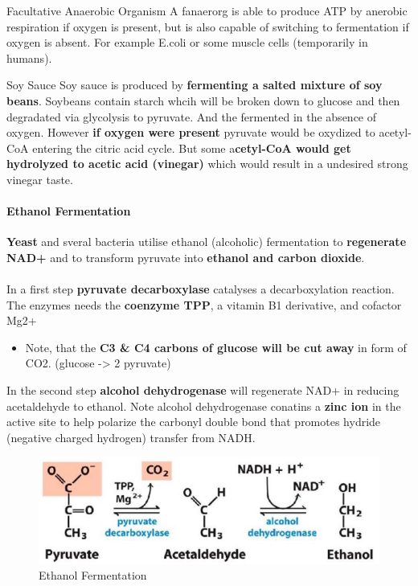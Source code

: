 \documentclass[../main.tex]{subfiles}
\begin{document}
\begin{DefWithTitle}{Facultative Anaerobic Organism}
	A \gls{fanaerorg} is able to produce ATP by anerobic respiration if oxygen is present, but is also capable of switching to fermentation if oxygen is absent. For example E.coli or some muscle cells (temporarily in humans). 
\end{DefWithTitle}

\begin{RemarkWithTitel}{Soy Sauce}
	Soy sauce is produced by \textbf{fermenting a salted mixture of soy beans}. Soybeans contain starch whcih will be broken down to glucose and then degradated via glycolysis to pyruvate. And the fermented in the absence of oxygen. However \textbf{if oxygen were present} pyruvate would be oxydized to acetyl-CoA entering the citric acid cycle. But some a\textbf{cetyl-CoA would get hydrolyzed to acetic acid (vinegar)} which would result in a undesired strong vinegar taste.
\end{RemarkWithTitel}

\paragraph{Ethanol Fermentation}
\textbf{Yeast} and sveral bacteria utilise ethanol (alcoholic) fermentation to \textbf{regenerate NAD+} and to transform pyruvate into \textbf{ethanol and carbon dioxide}.\\
\\
In a first step \textbf{pyruvate decarboxylase} catalyses a decarboxylation reaction. The enzymes needs the\textbf{ coenzyme TPP}, a vitamin B1 derivative, and cofactor Mg2+ 
\begin{itemize}
	\item Note, that the \textbf{C3 \& C4 carbons of glucose will be cut away} in form of CO2. (glucose -> 2 pyruvate)
\end{itemize}
In the second step \textbf{alcohol dehydrogenase} will regenerate NAD+ in reducing acetaldehyde to ethanol. Note alcohol dehydrogenase conatins a \textbf{zinc ion} in the active site to help polarize the carbonyl double bond that promotes hydride (negative charged hydrogen) transfer from NADH. 

\begin{figure}[H]
	\centering
	\includegraphics[width = 0.6 \textwidth]{ethanol}
	\caption{Ethanol Fermentation}
\end{figure}
\end{document}
